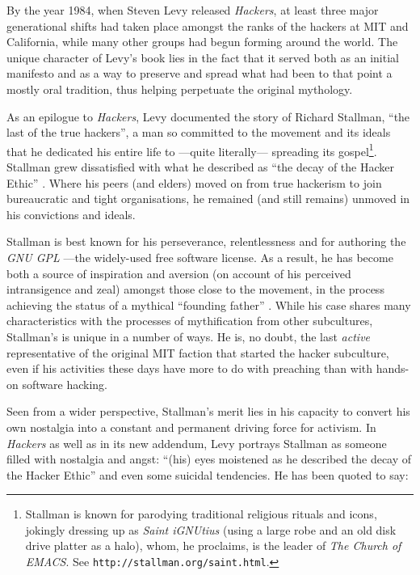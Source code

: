 By the year 1984, when Steven Levy released \textit{Hackers}, at least three major generational shifts had taken place amongst the ranks of the hackers at MIT and California, while many other groups had begun forming around the world. The unique character of Levy's book lies in the fact that it served both as an initial manifesto and as a way to preserve and spread what had been to that point a mostly oral tradition, thus helping perpetuate the original mythology.

As an epilogue to \textit{Hackers}, Levy documented the story of Richard Stallman, ``the last of the true hackers'', a man so committed to the movement and its ideals that he dedicated his entire life to ---quite literally--- spreading its gospel\footnote{Stallman is known for parodying traditional religious rituals and icons, jokingly dressing up as \textit{Saint iGNUtius} (using a large robe and an old disk drive platter as a halo), whom, he proclaims, is the leader of \textit{The Church of EMACS}. See \texttt{http://stallman.org/saint.html}.}. Stallman grew dissatisfied with what he described as ``the decay of the Hacker Ethic'' \citep[p.415]{levy84}. Where his peers (and elders) moved on from true hackerism to join bureaucratic and tight organisations, he remained (and still remains) unmoved in his convictions and ideals.

Stallman is best known for his perseverance, relentlessness and for authoring the \textit{GNU GPL} ---the widely-used free software license. As a result, he has become both a source of inspiration and aversion (on account of his perceived intransigence and zeal) amongst those close to the movement, in the process achieving the status of a mythical ``founding father'' \citep{jackson98}. While his case shares many characteristics with the processes of mythification from other subcultures, Stallman's is unique in a number of ways. He is, no doubt, the last \emph{active} representative of the original MIT faction that started the hacker subculture, even if his activities these days have more to do with preaching than with hands-on software hacking.

Seen from a wider perspective, Stallman's merit lies in his capacity to convert his own nostalgia into a constant and permanent driving force for activism. In \textit{Hackers} as well as in its new addendum, Levy portrays Stallman as someone filled with nostalgia and angst: ``(his) eyes moistened as he described the decay of the Hacker Ethic'' \citep[p.415]{levy84} and even some suicidal tendencies. He has been quoted to say:

